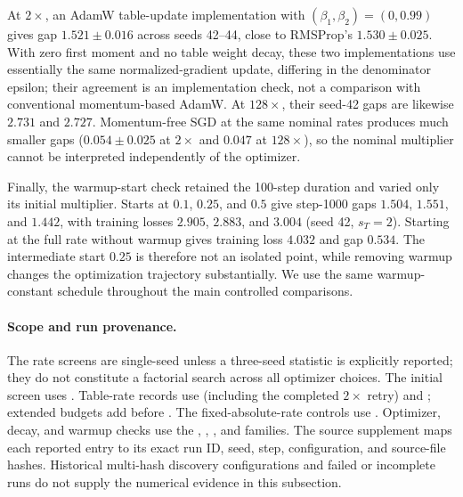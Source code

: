 At $2\times$, an AdamW table-update implementation with $(\beta_1,\beta_2)=(0,0.99)$ gives gap $1.521\pm0.016$ across seeds 42--44, close to RMSProp's $1.530\pm0.025$. With zero first moment and no table weight decay, these two implementations use essentially the same normalized-gradient update, differing in the denominator epsilon; their agreement is an implementation check, not a comparison with conventional momentum-based AdamW. At $128\times$, their seed-42 gaps are likewise $2.731$ and $2.727$. Momentum-free SGD at the same nominal rates produces much smaller gaps ($0.054\pm0.025$ at $2\times$ and $0.047$ at $128\times$), so the nominal multiplier cannot be interpreted independently of the optimizer.

Finally, the warmup-start check retained the 100-step duration and varied only its initial multiplier. Starts at $0.1$, $0.25$, and $0.5$ give step-1000 gaps $1.504$, $1.551$, and $1.442$, with training losses $2.905$, $2.883$, and $3.004$ (seed 42, $s_T=2$). Starting at the full rate without warmup gives training loss $4.032$ and gap $0.534$. The intermediate start $0.25$ is therefore not an isolated point, while removing warmup changes the optimization trajectory substantially. We use the same warmup-constant schedule throughout the main controlled comparisons.

\paragraph{Scope and run provenance.}
The rate screens are single-seed unless a three-seed statistic is explicitly reported; they do not constitute a factorial search across all optimizer choices. The initial screen uses . Table-rate records use  (including the completed $2\times$ retry) and ; extended budgets add  before . The fixed-absolute-rate controls use . Optimizer, decay, and warmup checks use the , , , and  families. The source supplement  maps each reported entry to its exact run ID, seed, step, configuration, and source-file hashes. Historical multi-hash discovery configurations and failed or incomplete runs do not supply the numerical evidence in this subsection.
